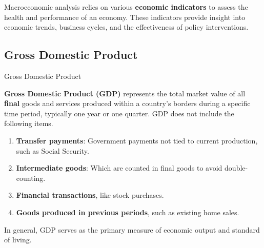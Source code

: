 \documentclass[10pt]{article}
\begin{document}
  Macroeconomic analysis relies on various \textbf{economic indicators} to assess the health and performance of an economy. These indicators provide insight into economic trends, business cycles, and the effectiveness of policy interventions.

  \subsection{Gross Domestic Product}

    \begin{core}[label=core:gdp]{Gross Domestic Product}

      \textbf{Gross Domestic Product (GDP)} represents the total market value of all \textbf{final} goods and services produced within a country's borders during a specific time period, typically one year or one quarter. GDP does not include the following items.

      \begin{enumerate}

        \item \textbf{Transfer payments}: Government payments not tied to current production, such as Social Security.

        \item \textbf{Intermediate goods}: Which are counted in final goods to avoid double-counting.

        \item \textbf{Financial transactions}, like stock purchases.

        \item \textbf{Goods produced in previous periods}, such as existing home sales.

      \end{enumerate}

      In general, GDP serves as the primary measure of economic output and standard of living. 

    \end{core}
\end{document}
